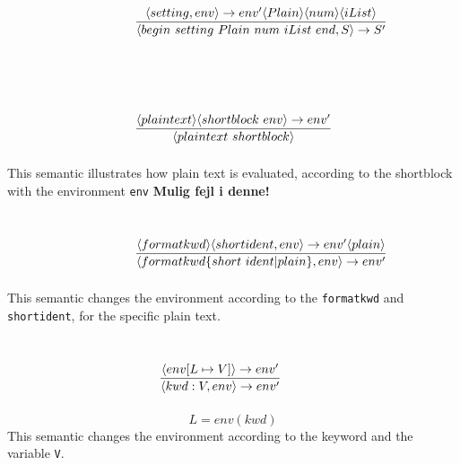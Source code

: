 \\ \\
\noindent{$[block]$}
\[ \condinfrule{\langle setting, env \rangle \ra env' \langle Plain \rangle \langle num \rangle \langle iList \rangle} { \langle begin~setting~Plain~num~iList~end, S \rangle \ra S'}{} \]
\\ \\
\noindent{$[plain]$}
\[ \condinfrule{\langle plaintext \rangle \langle shortblock~env \rangle \ra env'} { \langle plaintext~shortblock \rangle }{} \]
This semantic illustrates how plain text is evaluated, according to the shortblock with the environment \texttt{env} {\color{red}\textbf{Mulig fejl i denne!}}
\\ \\
\noindent{$[shortblock]$}
\[ \condinfrule{\langle formatkwd \rangle \langle shortident, env \rangle \ra env' \langle plain \rangle} { \langle formatkwd \{short~ident | plain\}, env \rangle \ra env'}{} \]
This semantic changes the environment according to the \texttt{formatkwd} and \texttt{shortident}, for the specific plain text.
\\ \\
\noindent{$[shortident]$}
\[ \condinfrule{\langle env [L \mapsto V] \rangle \ra env'} { \langle kwd : V, env \rangle \ra env'}{} \]
\[ L = env(kwd)\]
This semantic changes the environment according to the keyword and the variable \texttt{V}.